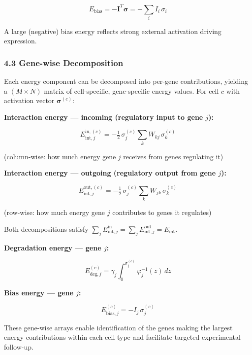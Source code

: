 \documentclass[11pt]{article}
\begin{document}
\begin{equation}
E_{\text{bias}} = -\mathbf{I}^T\boldsymbol{\sigma} = -\sum_i I_i\,\sigma_i 
\end{equation}


A large (negative) bias energy reflects strong external activation driving expression.


\subsubsection*{4.3 Gene-wise Decomposition}

Each energy component can be decomposed into per-gene contributions, yielding a $(M \times N)$ matrix of cell-specific, gene-specific energy values. For cell $c$ with activation vector $\boldsymbol{\sigma}^{(c)}$:

\textbf{Interaction energy — incoming (regulatory input to gene $j$):}

\begin{equation}
E_{\text{int},j}^{\text{in},(c)} = -\tfrac{1}{2}\,\sigma_j^{(c)}\sum_k W_{kj}\,\sigma_k^{(c)} 
\end{equation}

(column-wise: how much energy gene $j$ receives from genes regulating it)

\textbf{Interaction energy — outgoing (regulatory output from gene $j$):}

\begin{equation}
E_{\text{int},j}^{\text{out},(c)} = -\tfrac{1}{2}\,\sigma_j^{(c)}\sum_k W_{jk}\,\sigma_k^{(c)} 
\end{equation}

(row-wise: how much energy gene $j$ contributes to genes it regulates)

Both decompositions satisfy $\sum_j E_{\text{int},j}^{\text{in}} = \sum_j E_{\text{int},j}^{\text{out}} = E_{\text{int}}$.

\textbf{Degradation energy — gene $j$:}

\begin{equation}
E_{\text{deg},j}^{(c)} = \gamma_j \int_0^{\sigma_j^{(c)}} \varphi_j^{-1}(z)\,dz 
\end{equation}


\textbf{Bias energy — gene $j$:}

\begin{equation}
E_{\text{bias},j}^{(c)} = -I_j\,\sigma_j^{(c)} 
\end{equation}


These gene-wise arrays enable identification of the genes making the largest energy contributions within each cell type and facilitate targeted experimental follow-up.
\end{document}
